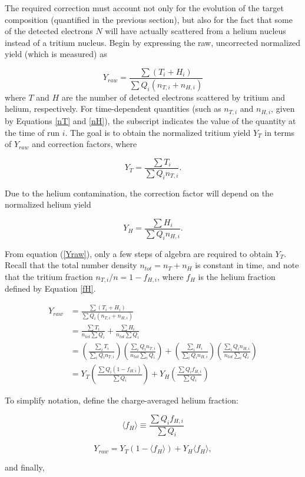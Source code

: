 The required correction must account not only for the evolution of the target composition (quantified in the previous section), but also for the fact that some of the detected electrons $N$ will have actually scattered from a helium nucleus instead of a tritium nucleus.  Begin by expressing the raw, uncorrected normalized yield (which is measured) as

\begin{equation}
Y_{raw} = \frac{\sum (T_i + H_i)}{\sum Q_i (n_{T,i} + n_{H,i})} \label{Yraw}
\end{equation}
where $T$ and $H$ are the number of detected electrons scattered by tritium and helium, respectively.  For time-dependent quantities (such as $n_{T,i}$ and $n_{H,i}$, given by Equations \ref{nT} and \ref{nH}), the subscript indicates the value of the quantity at the time of run $i$.  The goal is to obtain the normalized tritium yield $Y_T$ in terms of $Y_{raw}$ and correction factors, where

\begin{equation}
Y_T = \frac{\sum T_i}{\sum Q_i n_{T,i}}. 
\end{equation}

Due to the helium contamination, the correction factor will depend on the normalized helium yield

\begin{equation}
Y_H = \frac{\sum H_i}{\sum Q_i n_{H,i}}. 
\end{equation}

From equation (\ref{Yraw}), only a few steps of algebra are required to obtain $Y_T$.  Recall that the total number density $n_{tot}=n_T + n_H$ is constant in time, and note that the tritium fraction $n_{T,i}/n = 1 - f_{H,i}$, where $f_H$ is the helium fraction defined by Equation \ref{fH}.

\begin{align*}
Y_{raw}         &= \frac{\sum (T_i + H_i)}{\sum Q_i (n_{T,i} + n_{H,i})} \\[15pt]
&= \frac{\sum T_i}{n_{tot} \sum Q_i} + \frac{\sum H_i}{n_{tot} \sum Q_i} \\[15pt]
&= \left(\frac{\sum_i T_i}{\sum_i Q_i n_{T,i}}\right)\left(\frac{\sum_i Q_i n_{T,i}}{n_{tot} \sum_i Q_i}\right)
+ \left(\frac{\sum_i H_i}{\sum_i Q_i n_{H,i}}\right)\left(\frac{\sum_i Q_i n_{H,i}}{n_{tot} \sum_i Q_i}\right) \\[15pt]
&= Y_T\left(\frac{\sum Q_i(1-f_{H,i})}{\sum Q_i}\right) + Y_H\left(\frac{\sum Q_i f_{H,i}}{\sum Q_i}\right)
\end{align*}

To simplify notation, define the charge-averaged helium fraction:

\begin{equation}
\langle f_H \rangle \equiv \frac{\sum Q_i f_{H,i}}{\sum Q_i}
\end{equation}


\begin{equation}
Y_{raw} = Y_T(1-\langle f_H \rangle) + Y_H \langle f_H \rangle,
\end{equation}

and finally,

\cite{primer}